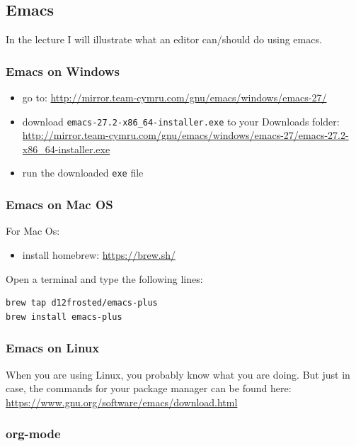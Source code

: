 \documentclass[11pt]{article}
\begin{document}
\subsection{Emacs}

In the lecture I will illustrate what an editor can/should do using emacs.


\subsubsection{Emacs on Windows}

\begin{itemize}
\item go to: \url{http://mirror.team-cymru.com/gnu/emacs/windows/emacs-27/}
\item download \texttt{emacs-27.2-x86\_64-installer.exe} to your Downloads folder: \url{http://mirror.team-cymru.com/gnu/emacs/windows/emacs-27/emacs-27.2-x86\_64-installer.exe}
\item run the downloaded \texttt{exe} file
\end{itemize}

\subsubsection{Emacs on Mac OS}

For Mac Os:
\begin{itemize}
\item install homebrew: \url{https://brew.sh/}
\end{itemize}

Open a terminal and type the following lines:

\begin{verbatim}
brew tap d12frosted/emacs-plus
brew install emacs-plus
\end{verbatim}

\subsubsection{Emacs on Linux}

When you are using Linux, you probably know what you are doing. But just in case, the commands for your package manager can be found here: \url{https://www.gnu.org/software/emacs/download.html}


\subsubsection{org-mode}
\end{document}
